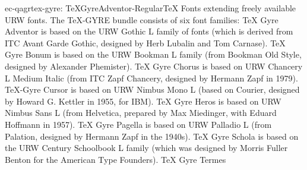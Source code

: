 \documentclass{ddltxtyp}
\begin{document}
\begin{package}{ec-qagr}{tex-gyre: TeXGyreAdventor-Regular}{{\TeX} Fonts extending freely available URW fonts.}
The {\TeX}-GYRE bundle consists of six font families: {\TeX} Gyre
Adventor is based on the URW Gothic L family of fonts (which is
derived from ITC Avant Garde Gothic, designed by Herb Lubalin
and Tom Carnase). {\TeX} Gyre Bonum is based on the URW Bookman L
family (from Bookman Old Style, designed by Alexander
Phemister). {\TeX} Gyre Chorus is based on URW Chancery L Medium
Italic (from ITC Zapf Chancery, designed by Hermann Zapf in
1979). {\TeX}-Gyre Cursor is based on URW Nimbus Mono L (based on
Courier, designed by Howard G. Kettler in 1955, for IBM). {\TeX}
Gyre Heros is based on URW Nimbus Sans L (from Helvetica,
prepared by Max Miedinger, with Eduard Hoffmann in 1957). {\TeX}
Gyre Pagella is based on URW Palladio L (from Palation,
designed by Hermann Zapf in the 1940s). {\TeX} Gyre Schola is
based on the URW Century Schoolbook L family (which was
designed by Morris Fuller Benton for the American Type
Founders). {\TeX} Gyre Termes %
\end{package}
\end{document}

